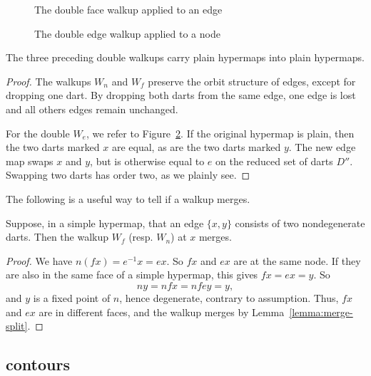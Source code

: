 \begin{figure}[htb]
  \centering
  \caption{The double face walkup applied to an edge}
  \label{fig:doubleface}
\end{figure}


\begin{figure}[htb]
  \centering
  \caption{The double edge walkup applied to a node}
  \label{fig:doubleedge}
\end{figure}


\begin{lemma}  The three preceding double walkups carry plain
hypermaps into plain hypermaps.
\end{lemma}

\begin{proof} The walkups $W_n$ and $W_f$ preserve the orbit
structure of edges, except for dropping one dart.  By dropping both
darts from the same edge, one edge is lost and all others edges
remain unchanged.

For the double $W_e$, we refer to Figure~\ref{fig:doubleedge}.  
If the
original hypermap is plain, then the two darts marked 
$x$ are equal, as are
the two darts marked $y$.  
The new edge map swaps $x$ and $y$, but is 
otherwise equal to $e$ on 
the reduced set of darts $D''$.  
Swapping two darts has order two, 
as we plainly see.
\end{proof}

The following is a useful way to tell if a walkup merges.


\begin{lemma}  Suppose, in a simple hypermap, 
that an edge $\{x,y\}$ consists of two nondegenerate darts.  
Then the walkup
 $W_f$ (resp. $W_n$) at $x$  merges.
\end{lemma}

\begin{proof} 
We have $n (f x) = e^{-1} x = e x$. So $f x$ and $e x$ are at the
same node. If they are also in the same face of a simple hypermap, 
this gives $f x = e x
= y$. So $$n y  = n f x = n f e y = y,$$ and $y$ is a fixed
point of $n$, hence degenerate, contrary to assumption.  
Thus, $f x$
and $e x$ are in different faces, and the walkup merges
by Lemma~\ref{lemma:merge-split}.  
\end{proof}




\subsection{contours}


